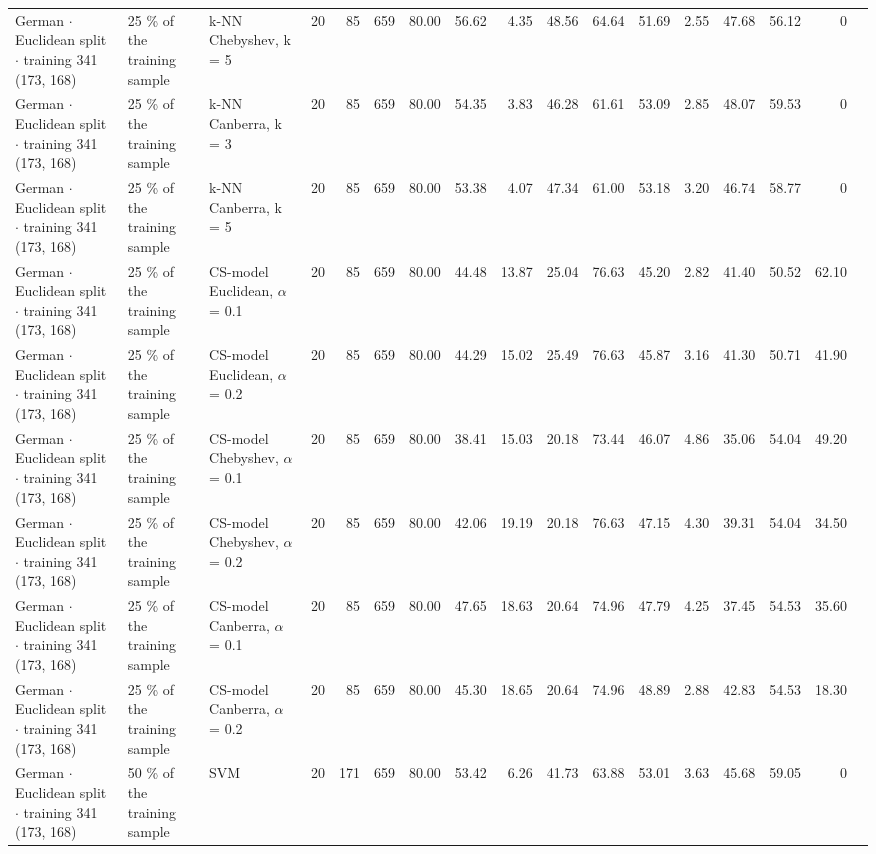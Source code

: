 \begin{longtable}{lllrrrrrrrrrrrrrl}
  German $\cdot$ Euclidean split $\cdot$ training 341 (173, 168) & 25 \% of the training sample & k-NN Chebyshev, k = 5 & 20 & 85 & 659 & 80.00 & 56.62 & 4.35 & 48.56 & 64.64 & 51.69 & 2.55 & 47.68 & 56.12 & 0 &  \\
  German $\cdot$ Euclidean split $\cdot$ training 341 (173, 168) & 25 \% of the training sample & k-NN Canberra, k = 3 & 20 & 85 & 659 & 80.00 & 54.35 & 3.83 & 46.28 & 61.61 & 53.09 & 2.85 & 48.07 & 59.53 & 0 &  \\
  German $\cdot$ Euclidean split $\cdot$ training 341 (173, 168) & 25 \% of the training sample & k-NN Canberra, k = 5 & 20 & 85 & 659 & 80.00 & 53.38 & 4.07 & 47.34 & 61.00 & 53.18 & 3.20 & 46.74 & 58.77 & 0 &  \\
  German $\cdot$ Euclidean split $\cdot$ training 341 (173, 168) & 25 \% of the training sample & CS-model Euclidean, $\alpha$ = 0.1 & 20 & 85 & 659 & 80.00 & 44.48 & 13.87 & 25.04 & 76.63 & 45.20 & 2.82 & 41.40 & 50.52 & 62.10 &  \\
  German $\cdot$ Euclidean split $\cdot$ training 341 (173, 168) & 25 \% of the training sample & CS-model Euclidean, $\alpha$ = 0.2 & 20 & 85 & 659 & 80.00 & 44.29 & 15.02 & 25.49 & 76.63 & 45.87 & 3.16 & 41.30 & 50.71 & 41.90 &  \\
  German $\cdot$ Euclidean split $\cdot$ training 341 (173, 168) & 25 \% of the training sample & CS-model Chebyshev, $\alpha$ = 0.1 & 20 & 85 & 659 & 80.00 & 38.41 & 15.03 & 20.18 & 73.44 & 46.07 & 4.86 & 35.06 & 54.04 & 49.20 &  \\
  German $\cdot$ Euclidean split $\cdot$ training 341 (173, 168) & 25 \% of the training sample & CS-model Chebyshev, $\alpha$ = 0.2 & 20 & 85 & 659 & 80.00 & 42.06 & 19.19 & 20.18 & 76.63 & 47.15 & 4.30 & 39.31 & 54.04 & 34.50 &  \\
  German $\cdot$ Euclidean split $\cdot$ training 341 (173, 168) & 25 \% of the training sample & CS-model Canberra, $\alpha$ = 0.1 & 20 & 85 & 659 & 80.00 & 47.65 & 18.63 & 20.64 & 74.96 & 47.79 & 4.25 & 37.45 & 54.53 & 35.60 &  \\
  German $\cdot$ Euclidean split $\cdot$ training 341 (173, 168) & 25 \% of the training sample & CS-model Canberra, $\alpha$ = 0.2 & 20 & 85 & 659 & 80.00 & 45.30 & 18.65 & 20.64 & 74.96 & 48.89 & 2.88 & 42.83 & 54.53 & 18.30 &  \\
  German $\cdot$ Euclidean split $\cdot$ training 341 (173, 168) & 50 \% of the training sample & SVM & 20 & 171 & 659 & 80.00 & 53.42 & 6.26 & 41.73 & 63.88 & 53.01 & 3.63 & 45.68 & 59.05 & 0 &  \\

\end{longtable}
